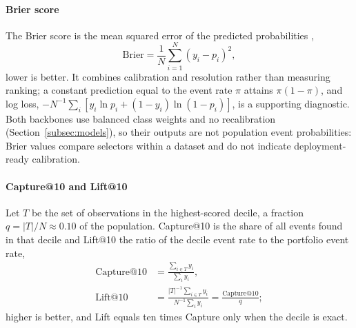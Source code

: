 \documentclass[final,5p,twocolumn]{elsarticle}
\begin{document}
\paragraph{Brier score}
The Brier score is the mean squared error of the predicted probabilities \cite{brier1950},
\begin{equation}
    \mathrm{Brier}=\frac{1}{N}\sum_{i=1}^{N}(y_i-p_i)^2 ,
    \label{eq:brier}
\end{equation}
lower is better. It combines calibration and resolution rather than measuring ranking; a constant prediction equal to the event rate $\pi$ attains $\pi(1-\pi)$, and log loss, $-N^{-1}\sum_i[y_i\ln p_i+(1-y_i)\ln(1-p_i)]$, is a supporting diagnostic. Both backbones use balanced class weights and no recalibration (Section~\ref{subsec:models}), so their outputs are not population event probabilities: Brier values compare selectors within a dataset and do not indicate deployment-ready calibration.

\paragraph{Capture@10 and Lift@10}
Let $T$ be the set of observations in the highest-scored decile, a fraction $q=|T|/N\approx0.10$ of the population. Capture@10 is the share of all events found in that decile and Lift@10 the ratio of the decile event rate to the portfolio event rate,
\begin{equation}
\begin{aligned}
    \mathrm{Capture@10}&=\frac{\sum_{i\in T}y_i}{\sum_{i}y_i},\\
    \mathrm{Lift@10}&=\frac{|T|^{-1}\sum_{i\in T}y_i}{N^{-1}\sum_{i}y_i}=\frac{\mathrm{Capture@10}}{q};
\end{aligned}
    \label{eq:capture10}
\end{equation}
higher is better, and Lift equals ten times Capture only when the decile is exact.
\end{document}
